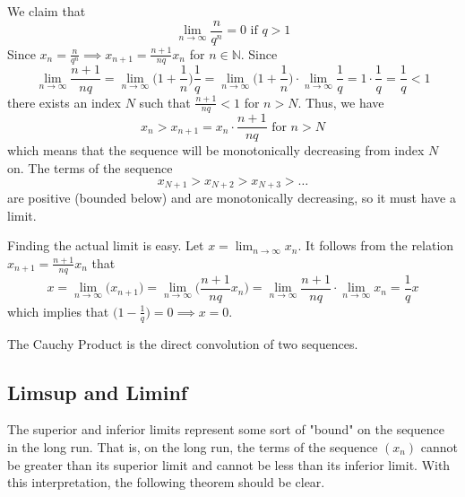   \begin{example}
    We claim that 
    \[\lim_{n\rightarrow \infty} \frac{n}{q^n} = 0 \text{ if } q>1\]
    Since $x_n = \frac{n}{q^n} \implies x_{n+1} = \frac{n+1}{nq} x_n$ for $n \in \mathbb{N}$. Since 
    \[\lim_{n\rightarrow \infty} \frac{n+1}{nq} = \lim_{n \rightarrow \infty} \bigg(1 + \frac{1}{n}\bigg) \frac{1}{q} = \lim_{n\rightarrow \infty} \bigg( 1 + \frac{1}{n} \bigg) \cdot \lim_{n\rightarrow \infty} \frac{1}{q} = 1 \cdot \frac{1}{q} = \frac{1}{q} < 1\]
    there exists an index $N$ such that $\frac{n+1}{nq} < 1$ for $n>N$. Thus, we have 
    \[x_n > x_{n+1} = x_n \cdot \frac{n+1}{nq} \text{ for } n > N\]
    which means that the sequence will be monotonically decreasing from index $N$ on. The terms of the sequence
    \[x_{N+1} > x_{N+2} > x_{N+3} > \ldots\]
    are positive (bounded below) and are monotonically decreasing, so it must have a limit. 

    Finding the actual limit is easy. Let $x = \lim_{n \rightarrow \infty} x_n$. It follows from the relation $x_{n+1} = \frac{n+1}{nq} x_n$ that
    \[x = \lim_{n\rightarrow \infty} \big(x_{n+1}\big) = \lim_{n \rightarrow \infty} \bigg(\frac{n+1}{nq} x_n \bigg) = \lim_{n \rightarrow \infty} \frac{n+1}{nq} \cdot \lim_{n \rightarrow \infty} x_n = \frac{1}{q} x\]
    which implies that $\big( 1 - \frac{1}{q}\big) = 0 \implies x = 0$.
  \end{example}

  \begin{definition}
    The Cauchy Product is the direct convolution of two sequences. 
  \end{definition}

\subsection{Limsup and Liminf} 

  The superior and inferior limits represent some sort of "bound" on the sequence in the long run. That is, on the long run, the terms of the sequence $(x_n)$ cannot be greater than its superior limit and cannot be less than its inferior limit. With this interpretation, the following theorem should be clear. 

